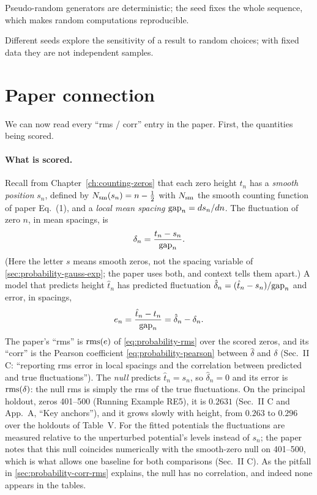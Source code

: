 \begin{keyideas}

\item Pseudo-random generators are deterministic; the seed fixes the whole sequence, which makes random computations reproducible.
\item Different seeds explore the sensitivity of a result to random choices; with fixed data they are not independent samples.

\end{keyideas}

\section{Paper connection}\label{sec:probability-paper}

We can now read every ``rms / corr'' entry in the paper. First, the quantities being scored.

\paragraph{What is scored.} Recall from Chapter~\ref{ch:counting-zeros} that each zero height $t_n$ has a \emph{smooth position} $s_n$, defined by $N_{\mathrm{sm}}(s_n)=n-\tfrac12$ with $N_{\mathrm{sm}}$ the smooth counting function of paper Eq.~(1), and a \emph{local mean spacing} $\mathrm{gap}_n=ds_n/dn$. The fluctuation of zero $n$, in mean spacings, is
\begin{equation}
\delta_n=\frac{t_n-s_n}{\mathrm{gap}_n}.
\label{eq:probability-delta}
\end{equation}
(Here the letter $s$ means smooth zeros, not the spacing variable of \cref{sec:probability-gauss-exp}; the paper uses both, and context tells them apart.) A model that predicts height $\hat t_n$ has predicted fluctuation $\hat\delta_n=(\hat t_n-s_n)/\mathrm{gap}_n$ and error, in spacings,
\[
e_n=\frac{\hat t_n-t_n}{\mathrm{gap}_n}=\hat\delta_n-\delta_n .
\]
The paper's ``rms'' is $\mathrm{rms}(e)$ of \cref{eq:probability-rms} over the scored zeros, and its ``corr'' is the Pearson coefficient \cref{eq:probability-pearson} between $\hat\delta$ and $\delta$ (Sec.~II C: ``reporting rms error in local spacings and the correlation between predicted and true fluctuations''). The \emph{null} predicts $\hat t_n=s_n$, so $\hat\delta_n=0$ and its error is $\mathrm{rms}(\delta)$: the null rms is simply the rms of the true fluctuations. On the principal holdout, zeros 401--500 (Running Example RE5), it is $0.2631$ (Sec.~II C and App.~A, ``Key anchors''), and it grows slowly with height, from $0.263$ to $0.296$ over the holdouts of Table~V. For the fitted potentials the fluctuations are measured relative to the unperturbed potential's levels instead of $s_n$; the paper notes that this null coincides numerically with the smooth-zero null on 401--500, which is what allows one baseline for both comparisons (Sec.~II C). As the pitfall in \cref{sec:probability-corr-rms} explains, the null has no correlation, and indeed none appears in the tables.

